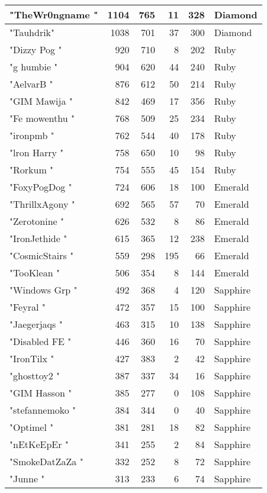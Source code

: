 \documentclass{article}
\begin{document}
\begin{table}[htbp]
\begin{tabular}{|l|r|r|r|r|l|}
"TheWr0ngname " & 1104 & 765 & 11 & 328 & Diamond \\ \hline
"Tauhdrik" & 1038 & 701 & 37 & 300 & Diamond \\ \hline
"Dizzy Pog " & 920 & 710 & 8 & 202 & Ruby \\ \hline
"g humbie " & 904 & 620 & 44 & 240 & Ruby \\ \hline
"AelvarB " & 876 & 612 & 50 & 214 & Ruby \\ \hline
"GIM Mawija " & 842 & 469 & 17 & 356 & Ruby \\ \hline
"Fe mowenthu " & 768 & 509 & 25 & 234 & Ruby \\ \hline
"ironpmb " & 762 & 544 & 40 & 178 & Ruby \\ \hline
"lron Harry " & 758 & 650 & 10 & 98 & Ruby \\ \hline
"Rorkum " & 754 & 555 & 45 & 154 & Ruby \\ \hline
"FoxyPogDog " & 724 & 606 & 18 & 100 & Emerald \\ \hline
"ThrillxAgony " & 692 & 565 & 57 & 70 & Emerald \\ \hline
"Zerotonine " & 626 & 532 & 8 & 86 & Emerald \\ \hline
"IronJethide " & 615 & 365 & 12 & 238 & Emerald \\ \hline
"CosmicStairs " & 559 & 298 & 195 & 66 & Emerald \\ \hline
"TooKlean " & 506 & 354 & 8 & 144 & Emerald \\ \hline
"Windows Grp " & 492 & 368 & 4 & 120 & Sapphire \\ \hline
"Feyral " & 472 & 357 & 15 & 100 & Sapphire \\ \hline
"Jaegerjaqs " & 463 & 315 & 10 & 138 & Sapphire \\ \hline
"Disabled FE " & 446 & 360 & 16 & 70 & Sapphire \\ \hline
"IronTilx " & 427 & 383 & 2 & 42 & Sapphire \\ \hline
"ghosttoy2 " & 387 & 337 & 34 & 16 & Sapphire \\ \hline
"GIM Hasson " & 385 & 277 & 0 & 108 & Sapphire \\ \hline
"stefannemoko " & 384 & 344 & 0 & 40 & Sapphire \\ \hline
"Optimel " & 381 & 281 & 18 & 82 & Sapphire \\ \hline
"nEtKeEpEr " & 341 & 255 & 2 & 84 & Sapphire \\ \hline
"SmokeDatZaZa " & 332 & 252 & 8 & 72 & Sapphire \\ \hline
"Junne " & 313 & 233 & 6 & 74 & Sapphire \\ \hline

\end{tabular}
\end{table}
\end{document}
